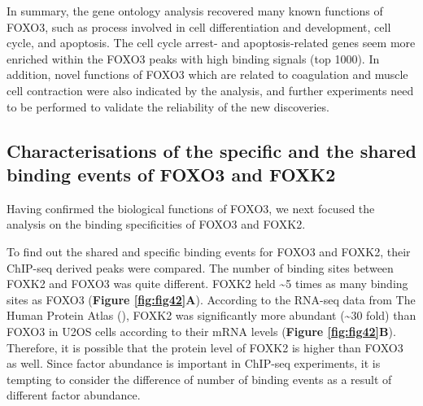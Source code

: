 In summary, the gene ontology analysis recovered many known functions of FOXO3, such as process involved in cell differentiation and development, cell cycle, and apoptosis. The cell cycle arrest- and apoptosis-related genes seem more enriched within the FOXO3 peaks with high binding signals (top 1000). In addition, novel functions of FOXO3 which are related to coagulation and muscle cell contraction were also indicated by the analysis, and further experiments need to be performed to validate the reliability of the new discoveries.

\subsection{Characterisations of the specific and the shared binding events of FOXO3 and FOXK2}

Having confirmed the biological functions of FOXO3, we next focused the analysis on the binding specificities of FOXO3 and FOXK2.

To find out the shared and specific binding events for FOXO3 and FOXK2, their ChIP-seq derived peaks were compared. The number of binding sites between FOXK2 and FOXO3 was quite different. FOXK2 held \textasciitilde 5 times as many binding sites as FOXO3 (\textbf{Figure \ref{fig:fig42}A}). According to the RNA-seq data from The Human Protein Atlas (\cite{uhlen2010towards}), FOXK2 was significantly more abundant (\textasciitilde 30 fold) than FOXO3 in U2OS cells according to their mRNA levels (\textbf{Figure \ref{fig:fig42}B}). Therefore, it is possible that the protein level of FOXK2 is higher than FOXO3 as well. Since factor abundance is important in ChIP-seq experiments, it is tempting to consider the difference of number of binding events as a result of different factor abundance.

